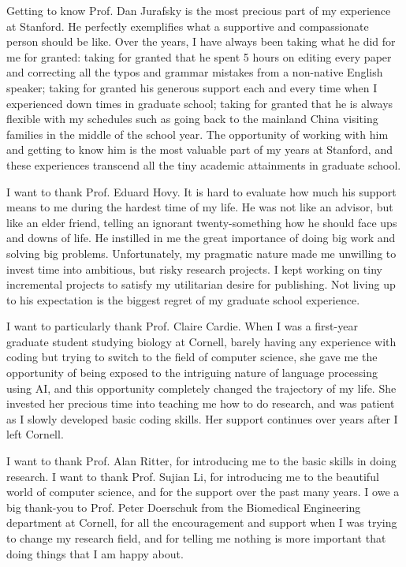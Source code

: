 
Getting to know Prof. Dan Jurafsky is the most precious part of my experience at Stanford. He perfectly exemplifies what a supportive and compassionate person should be like. 
Over the years, I have always been taking what he did for me
for granted: taking for granted that he spent 5 hours on 
editing
every paper and correcting all the typos and grammar mistakes from a non-native English speaker; taking for granted his generous support 
each and 
every time when I experienced down times in graduate school; taking for granted 
that he is always flexible with my schedules such as going back to 
the
mainland China visiting families in the middle of the school year. The opportunity of working with him and getting to know him is the most valuable part of my years at Stanford, and these experiences 
transcend all the tiny academic attainments in graduate school.

I want to thank 
Prof. Eduard Hovy. It is hard to evaluate how much his support means to me during the hardest time of my life. He was not like an advisor, but like an elder friend, 
telling an ignorant twenty-something how he should face ups and downs of life. He instilled in me the great importance of doing big work and solving big problems. Unfortunately, my pragmatic nature made me unwilling to invest time into ambitious, but risky research projects. I  kept working on tiny incremental projects to satisfy my utilitarian desire for publishing. Not living up to his expectation is the biggest regret of my graduate school experience. 


I want to particularly thank Prof. Claire Cardie. When I was a first-year graduate student studying biology at Cornell, barely having any experience with coding but trying to switch to the field of computer science,
she gave me the opportunity of being exposed to the intriguing nature of language processing using AI,  
and this opportunity
 completely changed the trajectory of my life. 
She invested her precious time into teaching me how to do research, and was patient as I slowly developed basic  coding skills. Her support continues over years after I left Cornell. 

I want to  thank Prof. Alan Ritter, for introducing me to 
 the basic skills in doing research.
I want to thank Prof. Sujian Li, for introducing me to the
beautiful 
 world of computer science, and for 
the support over the past many years.
I owe a big thank-you to Prof. Peter Doerschuk from the Biomedical Engineering department at Cornell, for all the encouragement and  support when I was trying to change my research field, and for telling me nothing is more important that doing things that I am happy about.  
 
